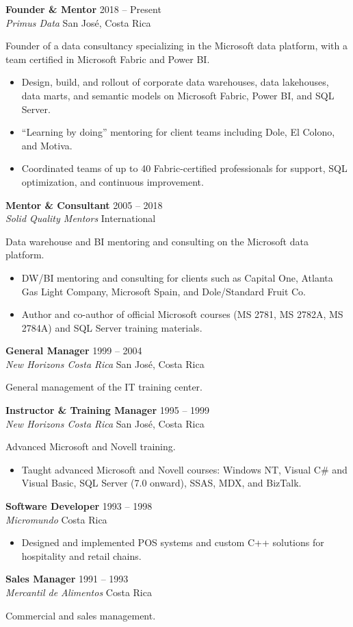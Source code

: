 \documentclass[10.5pt]{article}
\newcommand{\role}[4]{%
  \vspace{4pt}%
  {\bfseries #1} \hfill {\color{muted}\small #4}\\[1pt]%
  {\itshape #2}\,\textperiodcentered\,{\color{muted}#3}\par%
  \vspace{2pt}%
}
\begin{document}
\role{Founder \& Mentor}{Primus Data}{San Jos\'e, Costa Rica}{2018 -- Present}
Founder of a data consultancy specializing in the Microsoft data platform, with a team certified in Microsoft Fabric and Power BI.
\begin{itemize}
  \item Design, build, and rollout of corporate data warehouses, data lakehouses, data marts, and semantic models on Microsoft Fabric, Power BI, and SQL Server.
  \item ``Learning by doing'' mentoring for client teams including Dole, El Colono, and Motiva.
  \item Coordinated teams of up to 40 Fabric-certified professionals for support, SQL optimization, and continuous improvement.
\end{itemize}

\role{Mentor \& Consultant}{Solid Quality Mentors}{International}{2005 -- 2018}
Data warehouse and BI mentoring and consulting on the Microsoft data platform.
\begin{itemize}
  \item DW/BI mentoring and consulting for clients such as Capital One, Atlanta Gas Light Company, Microsoft Spain, and Dole/Standard Fruit Co.
  \item Author and co-author of official Microsoft courses (MS 2781, MS 2782A, MS 2784A) and SQL Server training materials.
\end{itemize}

\role{General Manager}{New Horizons Costa Rica}{San Jos\'e, Costa Rica}{1999 -- 2004}
General management of the IT training center.

\role{Instructor \& Training Manager}{New Horizons Costa Rica}{San Jos\'e, Costa Rica}{1995 -- 1999}
Advanced Microsoft and Novell training.
\begin{itemize}
  \item Taught advanced Microsoft and Novell courses: Windows NT, Visual C\# and Visual Basic, SQL Server (7.0 onward), SSAS, MDX, and BizTalk.
\end{itemize}

\role{Software Developer}{Micromundo}{Costa Rica}{1993 -- 1998}
\begin{itemize}
  \item Designed and implemented POS systems and custom C++ solutions for hospitality and retail chains.
\end{itemize}

\role{Sales Manager}{Mercantil de Alimentos}{Costa Rica}{1991 -- 1993}
Commercial and sales management.
\end{document}
